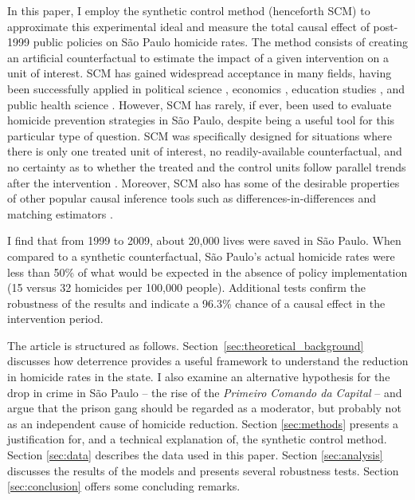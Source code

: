 In this paper, I employ the synthetic control method (henceforth SCM) to approximate this experimental ideal and measure the total causal effect of post-1999 public policies on São Paulo homicide rates. The method consists of creating an artificial counterfactual to estimate the impact of a given intervention on a unit of interest. SCM has gained widespread acceptance in many fields, having been successfully applied in political science \citep{abadie2014, montalvo2011}, economics \citep{billmeier2013, coffman2012, jinjarak2013}, education studies \citep{hinrichs2012}, and public health science \citep{heim2014}. However, SCM has rarely, if ever, been used to evaluate homicide prevention strategies in São Paulo, despite being a useful tool for this particular type of question. SCM was specifically designed for situations where there is only one treated unit of interest, no readily-available counterfactual, and no certainty as to whether the treated and the control units follow parallel trends after the intervention \citep{abadie2003, abadie2010, abadie2014}. Moreover, SCM also has some of the desirable properties of other popular causal inference tools such as differences-in-differences \citep{angrist2008mostly, bertrand2004much} and matching estimators \citep{dehejia2002propensity, ho2007matching, rubin1973matching, stuart2010matching}. 

I find that from 1999 to 2009, about 20,000 lives were saved in São Paulo. When compared to a synthetic counterfactual, São Paulo's actual homicide rates were less than 50\% of what would be expected in the absence of policy implementation (15 versus 32 homicides per 100,000 people). Additional tests confirm the robustness of the results and indicate a 96.3\% chance of a causal effect in the intervention period. 

The article is structured as follows. Section~\ref{sec:theoretical_background} discusses how deterrence provides a useful framework to understand the reduction in homicide rates in the state. I also examine an alternative hypothesis for the drop in crime in São Paulo -- the rise of the \emph{Primeiro Comando da Capital} -- and argue that the prison gang should be regarded as a moderator, but probably not as an independent cause of homicide reduction. Section \ref{sec:methods} presents a justification for, and a technical explanation of, the synthetic control method. Section \ref{sec:data} describes the data used in this paper. Section \ref{sec:analysis} discusses the results of the models and presents several robustness tests. Section \ref{sec:conclusion} offers some concluding remarks.

